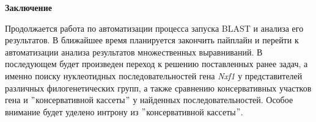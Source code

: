 \newpage
\begin{center}
    \textbf{\large Заключение}
\end{center}


Продолжается работа по автоматизации процесса запуска BLAST и анализа его результатов.
В ближайшее время планируется закончить пайплайн и перейти к автоматизации анализа результатов множественных выравниваний.
В последующем будет произведен переход к решению поставленных ранее задач, а именно поиску нуклеотидных последовательностей гена \textit{Nxf1} у представителей различных филогенетических групп, а также сравнению консервативных участков гена и \("\)консервативной кассеты\("\) у найденных последовательностей.
Особое внимание будет уделено интрону из \("\)консервативной кассеты\("\).
